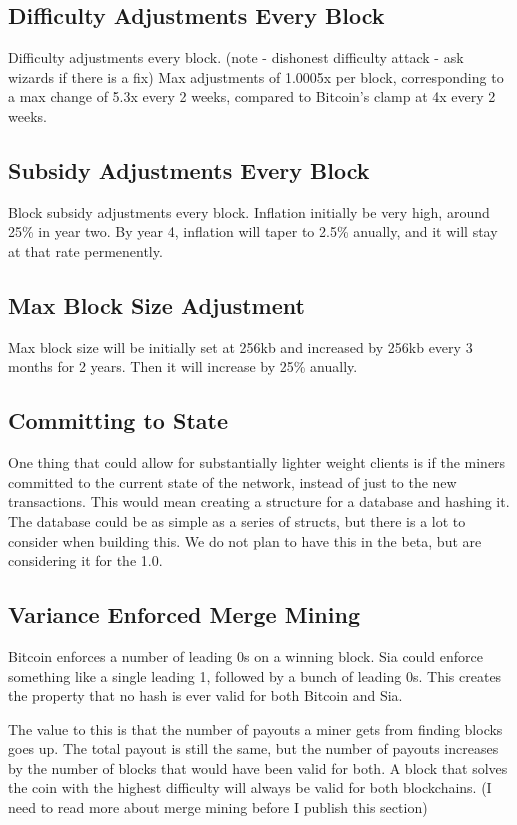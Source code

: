 \documentclass[twocolumn]{article}
\begin{document}
\subsection{Difficulty Adjustments Every Block}
Difficulty adjustments every block. (note - dishonest difficulty attack - ask wizards if there is a fix)
Max adjustments of 1.0005x per block, corresponding to a max change of 5.3x every 2 weeks, compared to Bitcoin's clamp at 4x every 2 weeks.

\subsection{Subsidy Adjustments Every Block}
Block subsidy adjustments every block.
Inflation initially be very high, around 25\% in year two.
By year 4, inflation will taper to 2.5\% anually, and it will stay at that rate permenently.

\subsection{Max Block Size Adjustment}
Max block size will be initially set at 256kb and increased by 256kb every 3 months for 2 years.
Then it will increase by 25\% anually.

\subsection{Committing to State}
One thing that could allow for substantially lighter weight clients is if the miners committed to the current state of the network, instead of just to the new transactions.
This would mean creating a structure for a database and hashing it.
The database could be as simple as a series of structs, but there is a lot to consider when building this.
We do not plan to have this in the beta, but are considering it for the 1.0.

\subsection{Variance Enforced Merge Mining}
Bitcoin enforces a number of leading 0s on a winning block.
Sia could enforce something like a single leading 1, followed by a bunch of leading 0s.
This creates the property that no hash is ever valid for both Bitcoin and Sia.

The value to this is that the number of payouts a miner gets from finding blocks goes up.
The total payout is still the same, but the number of payouts increases by the number of blocks that would have been valid for both.
A block that solves the coin with the highest difficulty will always be valid for both blockchains.
(I need to read more about merge mining before I publish this section)
\end{document}
